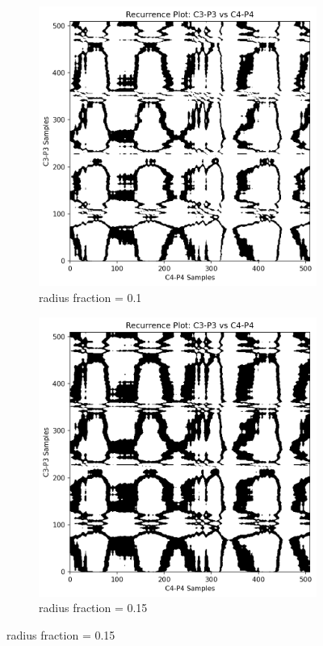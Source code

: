 \documentclass{article}
\begin{document}
	\begin{figure}[htbp]
	    \centering
	    \begin{subfigure}[t]{0.45\textwidth}
		\centering
		\includegraphics[width=\textwidth]{rr_compare/r01_epil.png}
		\caption{radius fraction = 0.1}
		\label{subfig:rp1}
	    \end{subfigure}
	    \hfill %
	    \begin{subfigure}[t]{0.45\textwidth}
		\centering
		\includegraphics[width=\textwidth]{rr_compare/r015_epil.png}
		\caption{radius fraction = 0.15}
		\label{subfig:rp2}
	    \end{subfigure}


\end{figure}
\end{document}
